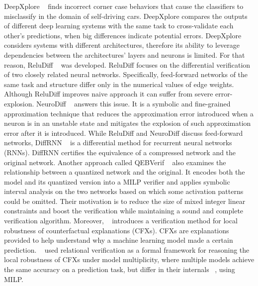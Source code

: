 DeepXplore ~\cite{DEEPXPLORE} finds incorrect corner case behaviors that cause the classifiers to misclassify in the domain of self-driving cars. DeepXplore compares the outputs of different deep learning systems with the same task to cross-validate each other’s predictions, when big differences indicate potential errors. DeepXplore considers systems with different architectures, therefore its ability to leverage dependencies between the architectures' layers and neurons is limited. For that reason, ReluDiff ~\cite{RELUDIFF} was developed. ReluDiff focuses on the differential verification of two closely related neural networks. Specifically, feed-forward networks of the same task and structure differ only in the numerical values of edge weights. Although ReluDiff improves naive approach it can suffer from severe error-explosion. NeuroDiff ~\cite{NEURODIFF} answers this issue. It is a symbolic and fine-grained approximation technique that reduces the approximation error introduced when a neuron is in an unstable state and mitigates the explosion of such approximation error after it is introduced. While ReluDiff and NeuroDiff discuss feed-forward networks, DiffRNN ~\cite{DIFFRNN} is a differential method for recurrent neural networks (RNNs). DiffRNN certifies the equivalence of a compressed network and the original network. Another approach called QEBVerif ~\cite{QEBVERIF} also examines the relationship between a quantized network and the original. It encodes both the model and its quantized version into a MILP verifier and applies symbolic interval analysis on the two networks based on which some activation patterns could be omitted. Their motivation is to reduce the size of mixed integer linear constraints and boost the verification while maintaining a sound and complete verification algorithm. Moreover, ~\cite{CFXROBUSTNESS} introduces a verification method for local robustness of counterfactual explanations (CFXs). CFXs are explanations provided to help understand why a machine learning model made a certain prediction. ~\cite{CFXROBUSTNESS} used relational verification as a formal framework for reasoning the local robustness of CFXs under model multiplicity, where multiple models achieve the same accuracy on a prediction task, but differ in their internals ~\cite{PREDICTIVEMULTIPICITY}, using MILP.

